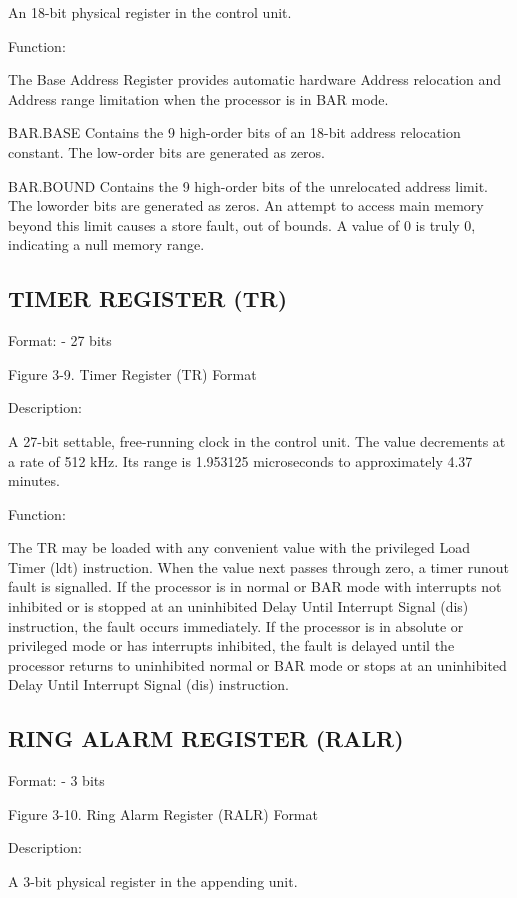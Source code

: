 An 18-bit physical register in the control unit.

Function:

The Base Address Register provides automatic hardware Address relocation and
Address range limitation when the processor is in BAR mode.

BAR.BASE Contains the 9 high-order bits of an 18-bit address relocation
constant.  The low-order bits are generated as zeros.

BAR.BOUND Contains the 9 high-order bits of the unrelocated address limit. The
loworder bits are generated as zeros. An attempt to access main memory beyond
this limit causes a store fault, out of bounds. A value of 0 is truly 0,
indicating a null memory range.

\subsection{TIMER REGISTER (TR)}

Format: - 27 bits

Figure 3-9. Timer Register (TR) Format

Description:

A 27-bit settable, free-running clock in the control unit. The value decrements
at a rate of 512 kHz. Its range is 1.953125 microseconds to approximately 4.37
minutes.

Function:

The TR may be loaded with any convenient value with the privileged Load Timer
(ldt) instruction. When the value next passes through zero, a timer runout
fault is signalled. If the processor is in normal or BAR mode with interrupts
not inhibited or is stopped at an uninhibited Delay Until Interrupt Signal
(dis) instruction, the fault occurs immediately. If the processor is in
absolute or privileged mode or has interrupts inhibited, the fault is delayed
until the processor returns to uninhibited normal or BAR mode or stops at an
uninhibited Delay Until Interrupt Signal (dis) instruction.

\subsection{RING ALARM REGISTER (RALR)}

Format: - 3 bits

Figure 3-10. Ring Alarm Register (RALR) Format

Description:

A 3-bit physical register in the appending unit.

